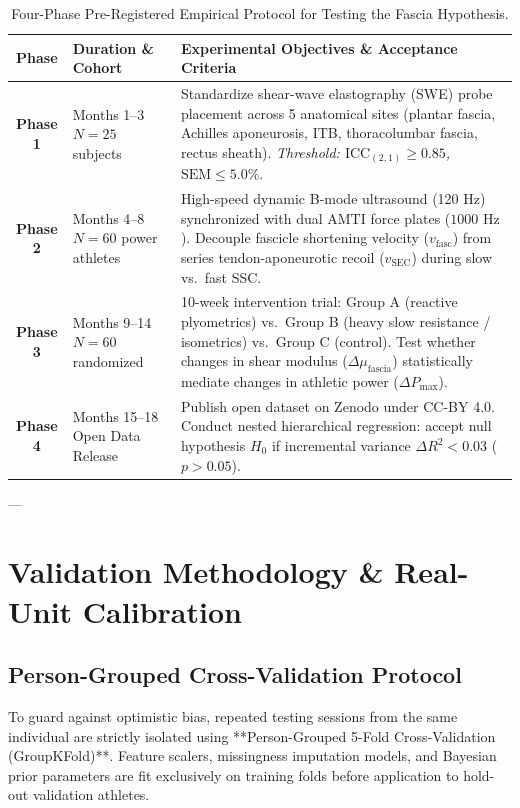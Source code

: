 \documentclass[11pt,a4paper]{article}
\begin{document}
\begin{table}[htbp]
\centering
\small
\caption{Four-Phase Pre-Registered Empirical Protocol for Testing the Fascia Hypothesis.}
\label{tab:roadmap}
\begin{tabularx}{\textwidth}{cp{3.8cm}p{8.8cm}}
\toprule
\textbf{Phase} & \textbf{Duration \& Cohort} & \textbf{Experimental Objectives \& Acceptance Criteria} \\
\midrule
\textbf{Phase 1} & Months 1--3 \newline $N = 25$ subjects & Standardize shear-wave elastography (SWE) probe placement across 5 anatomical sites (plantar fascia, Achilles aponeurosis, ITB, thoracolumbar fascia, rectus sheath). \newline \textit{Threshold: $\text{ICC}_{(2,1)} \ge 0.85$, $\text{SEM} \le 5.0\%$}. \\
\addlinespace
\textbf{Phase 2} & Months 4--8 \newline $N = 60$ power athletes & High-speed dynamic B-mode ultrasound (120 Hz) synchronized with dual AMTI force plates ($1000\text{ Hz}$). Decouple fascicle shortening velocity ($v_{\text{fasc}}$) from series tendon-aponeurotic recoil ($v_{\text{SEC}}$) during slow vs.\ fast SSC. \\
\addlinespace
\textbf{Phase 3} & Months 9--14 \newline $N = 60$ randomized & 10-week intervention trial: Group A (reactive plyometrics) vs.\ Group B (heavy slow resistance / isometrics) vs.\ Group C (control). Test whether changes in shear modulus ($\Delta \mu_{\text{fascia}}$) statistically mediate changes in athletic power ($\Delta P_{\text{max}}$). \\
\addlinespace
\textbf{Phase 4} & Months 15--18 \newline Open Data Release & Publish open dataset on Zenodo under CC-BY 4.0. Conduct nested hierarchical regression: accept null hypothesis $H_0$ if incremental variance $\Delta R^2 < 0.03$ ($p > 0.05$). \\
\bottomrule
\end{tabularx}
\end{table}

---

\section{Validation Methodology \& Real-Unit Calibration}

\subsection{Person-Grouped Cross-Validation Protocol}
To guard against optimistic bias, repeated testing sessions from the same individual are strictly isolated using **Person-Grouped 5-Fold Cross-Validation (GroupKFold)**. Feature scalers, missingness imputation models, and Bayesian prior parameters are fit exclusively on training folds before application to hold-out validation athletes.
\end{document}
